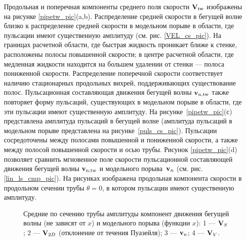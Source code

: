 Продольная и поперечная компоненты среднего поля скорости $\mathbf{V}_\mathrm{tw}$ изображены на рисунке \ref{pipetw_pic}(a,b). Распределение средней скорости в бегущей волне близко к распределение средней скорости в модельном порыве в области, где пульсации имеют существенную амплитуду (см. рис. \ref{VEL_cs_pic}). На границах расчетной области, где быстрая жидкость проникает ближе к стенке, расположены полосы повышенной скорости; в центре расчетной области, где медленная жидкости находится на большем удалении от стенки --- полоса пониженной скорости. Распределение поперечной скорости соответствует наличию стационарных продольных вихрей, поддерживающих существование полос. Пульсационная составляющая движения бегущей волны $\mathbf{v}_\mathrm{n,tw}$ также повторяет форму пульсаций, существующих в модельном порыве в области, где эти пульсации имеют существенную амплитуду. На рисунке~\ref{pipetw_pic}(с) представлена амплитуда пульсаций в бегущей волне (амплитуда пульсаций в модельном порыве представлена на рисунке~\ref{puls_cs_pic}). Пульсации сосредоточены между полосами повышенной и пониженной скорости, а также между полосой повышенной скорости и осью трубы. Рисунок \ref{pipetw_pic}(d) позволяет сравнить мгновенное поле скорости пульсационной составляющей движения бегущей волны $\mathbf{v}_\mathrm{n,tw}$ и модельного порыва~$\mathbf{v}_n$ (см. рис. \ref{lin_ls_cmp_pic}). На рисунках изображена продольная компонента скорости в продольном сечении трубы $\theta = 0$, в котором пульсации имеют существенную амплитуду. 

\begin{figure}
\caption{Средние по сечению трубы амплитуды компонент движения бегущей волны (не зависят от $x$) и модельного порыва (функции $x$): 1 --- $\mathbf{V}_S$; 2 --- $\mathbf{V}_{2D}$ (отклонение от течения Пуазейля); 3 --- $\mathbf{v}_n$; 4 --- $\mathbf{V}_V$.}
\label{pipetw_amp_pic}
\end{figure}

